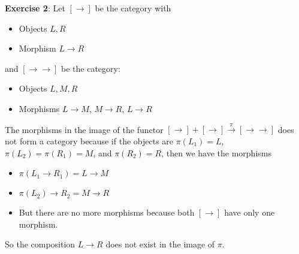 \documentclass{article}
\begin{document}
\textbf{Exercise 2}: Let $[\rightarrow ]$ be the category with 
    \begin{itemize}
        \item Objects $L, R$

        \item Morphism $L \rightarrow R$ 
    \end{itemize}
and $[\rightarrow \rightarrow ]$ be the category:
    \begin{itemize}
        \item Objects $L, M, R$

        \item Morphisms $L \rightarrow M$, $M \rightarrow R$, $L \rightarrow R$ 
    \end{itemize}
    \begin{answer}
        The morphisms in the image of the functor $[\rightarrow ] + [\rightarrow ] \xrightarrow{\pi}  [\rightarrow \rightarrow ]$ does not form a category because if the objects are $\pi(L_{1}) = L$, $\pi(L_{2}) = \pi(R_{1}) = M$, and $\pi(R_{2}) = R$, then we have the morphisms 
            \begin{itemize}
                \item $\pi(L_{1} \rightarrow R_{1}) = L \rightarrow M$

                \item $\pi(L_{2}) \rightarrow R_{2} = M \rightarrow R$

                \item But there are no more morphisms because both $[\rightarrow ]$ have only one morphism.
            \end{itemize}
        So the composition $L \rightarrow R$ does not exist in the image of $\pi$.
    \end{answer}
\end{document}
